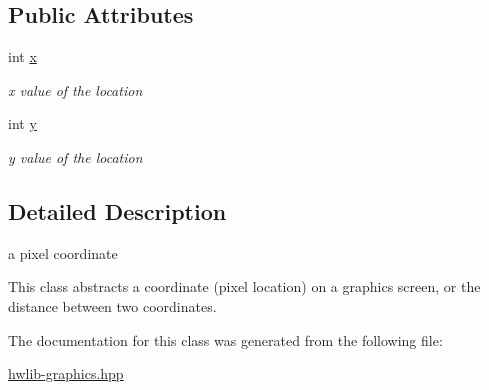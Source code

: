 \subsection*{Public Attributes}
\begin{DoxyCompactItemize}
\item 
int \hyperlink{classhwlib_1_1location_abe7c9cfa19fff1fc38c9d803d0b5ce75}{x}\hypertarget{classhwlib_1_1location_abe7c9cfa19fff1fc38c9d803d0b5ce75}{}\label{classhwlib_1_1location_abe7c9cfa19fff1fc38c9d803d0b5ce75}

\begin{DoxyCompactList}\small\item\em x value of the location \end{DoxyCompactList}\item 
int \hyperlink{classhwlib_1_1location_ae8f5e3edb0ae2ec336afc6efc09f3762}{y}\hypertarget{classhwlib_1_1location_ae8f5e3edb0ae2ec336afc6efc09f3762}{}\label{classhwlib_1_1location_ae8f5e3edb0ae2ec336afc6efc09f3762}

\begin{DoxyCompactList}\small\item\em y value of the location \end{DoxyCompactList}\end{DoxyCompactItemize}


\subsection{Detailed Description}
a pixel coordinate 

This class abstracts a coordinate (pixel location) on a graphics screen, or the distance between two coordinates. 

The documentation for this class was generated from the following file\+:\begin{DoxyCompactItemize}
\item 
\hyperlink{hwlib-graphics_8hpp}{hwlib-\/graphics.\+hpp}\end{DoxyCompactItemize}
